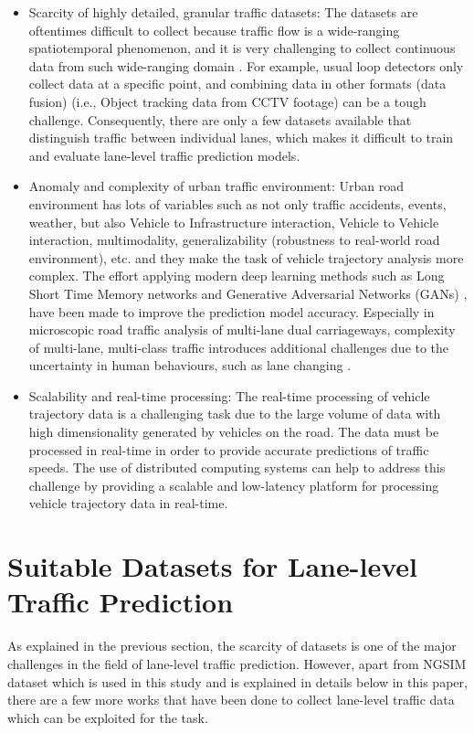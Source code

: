\documentclass[11pt]{uonthesis}
\begin{document}
\begin{itemize}
    \item Scarcity of highly detailed, granular traffic datasets:
The datasets are oftentimes difficult to collect because traffic flow is a wide-ranging spatiotemporal phenomenon, and it is very challenging to collect continuous data from such wide-ranging domain \cite{seo2020evaluation}. For example, usual loop detectors only collect data at a specific point, and combining data in other formats (data fusion) (i.e., Object tracking data from CCTV footage) can be a tough challenge. Consequently, there are only a few datasets available that distinguish traffic between individual lanes, which makes it difficult to train and evaluate lane-level traffic prediction models.
    \item Anomaly and complexity of urban traffic environment:
Urban road environment has lots of variables such as not only traffic accidents, events, weather, but also Vehicle to Infrastructure interaction, Vehicle to Vehicle interaction, multimodality, generalizability (robustness to real-world road environment), etc. and they make the task of vehicle trajectory analysis more complex. The effort applying modern deep learning methods such as Long Short Time Memory networks and Generative Adversarial Networks (GANs) \cite{rossi2021vehicle}, have been made to improve the prediction model accuracy. Especially in microscopic road traffic analysis of multi-lane dual carriageways, complexity of multi-lane, multi-class traffic introduces additional challenges due to the uncertainty in human behaviours, such as lane changing \cite{DAHIYA2022100066}.
    \item Scalability and real-time processing:
The real-time processing of vehicle trajectory data is a challenging task due to the large volume of data with high dimensionality generated by vehicles on the road. The data must be processed in real-time in order to provide accurate predictions of traffic speeds. The use of distributed computing systems can help to address this challenge by providing a scalable and low-latency platform for processing vehicle trajectory data in real-time.  %
\end{itemize}

\section{Suitable Datasets for Lane-level Traffic Prediction}
As explained in the previous section, the scarcity of datasets is one of the major challenges in the field of lane-level traffic prediction. However, apart from NGSIM dataset which is used in this study and is explained in details below in this paper, there are a few more works that have been done to collect lane-level traffic data which can be exploited for the task. 
\end{document}
